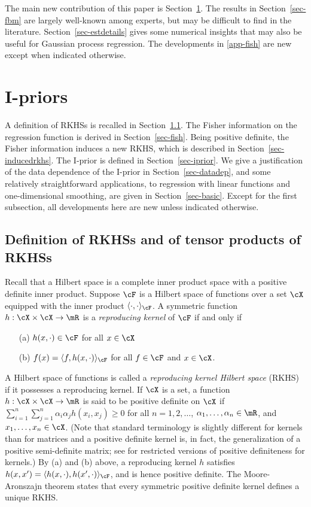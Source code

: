 \documentclass[preprint,12pt,authoryear]{elsarticle}
\begin{document}
The main new contribution of this paper is Section~\ref{sec-noninf}. The results in Section~\ref{sec-fbm} are largely well-known among experts, but may be difficult to find in the literature. Section~\ref{sec-estdetails} gives some numerical insights that may also be useful for Gaussian process regression. The developments in \ref{app-fish} are new except when indicated otherwise.



\section{I-priors} \label{sec-noninf}

A definition of RKHSs is recalled in Section~\ref{sec-rkhs}. The Fisher information on the regression function is derived in Section~\ref{sec-fish}. Being positive definite, the Fisher information induces a new RKHS, which is described in Section~\ref{sec-inducedrkhs}. The I-prior is defined in Section~\ref{sec-iprior}. 
We give a justification of the data dependence of the I-prior in Section~\ref{sec-datadep}, and some relatively straightforward applications, to regression with linear functions and one-dimensional smoothing, are given in Section~\ref{sec-basic}.
Except for the first subsection, all developments here are new unless indicated otherwise.



\subsection{Definition of RKHSs and of tensor products of RKHSs}\label{sec-rkhs}

Recall that a Hilbert space is a complete inner product space with a positive definite inner product.
Suppose $\cF$ is a Hilbert space of functions over a set $\cX$ equipped with the inner product $\langle\cdot,\cdot\rangle_\cF$. A symmetric function $h:\cX\times\cX\rightarrow\mR$ is a {\em reproducing kernel} of $\cF$ if and only if
\begin{itemize}
	\item[(a)] $h(x,\cdot)\in\cF$ for all $x\in\cX$
	\item[(b)] $f(x)=\langle f,h(x,\cdot)\rangle_\cF$ for all $f\in\cF$ and $x\in\cX$.
\end{itemize}
A Hilbert space of functions is called a {\em reproducing kernel Hilbert space} (RKHS) if it possesses a reproducing kernel.
If $\cX$ is a set, a function $h:\cX\times\cX\rightarrow\mR$ is said to be positive definite on $\cX$ if
$\sum_{i=1}^n\sum_{j=1}^n\alpha_i\alpha_jh(x_i,x_j)\ge 0$ for all $n=1,2,\ldots$, $\alpha_1,\ldots,\alpha_n\in\mR$, and $x_1,\ldots,x_n\in\cX$.
(Note that standard terminology is slightly different for kernels than for matrices and a positive definite kernel is, in fact, the generalization of a positive semi-definite matrix; see \citet{sfl11} for restricted versions of positive definiteness for kernels.)
By (a) and (b) above, a reproducing kernel $h$ satisfies $h(x,x')=\langle h(x,\cdot),h(x',\cdot)\rangle_\cF$, and is hence positive definite.
The Moore-Aronszajn theorem states that every symmetric positive definite kernel defines a unique RKHS.
\end{document}
